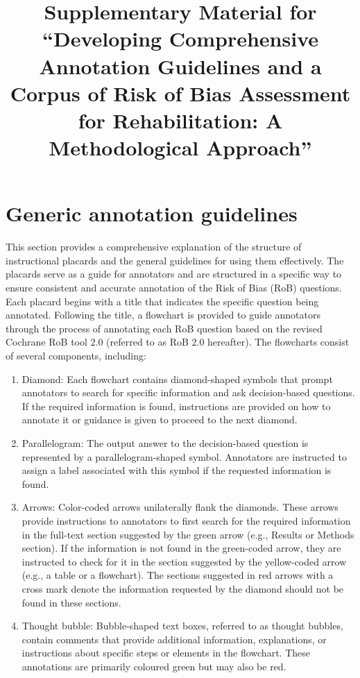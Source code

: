 \documentclass[sn-mathphys,Numbered]{sn-jnl}%
\begin{document}
\title[Article Title]{Supplementary Material for ``Developing Comprehensive Annotation Guidelines and a Corpus of Risk of Bias Assessment for Rehabilitation: A Methodological Approach''}



\maketitle


\section*{Generic annotation guidelines}
\label{sec:generic}
%
This section provides a comprehensive explanation of the structure of instructional placards and the general guidelines for using them effectively.
The placards serve as a guide for annotators and are structured in a specific way to ensure consistent and accurate annotation of the Risk of Bias (RoB) questions.
Each placard begins with a title that indicates the specific question being annotated.
Following the title, a flowchart is provided to guide annotators through the process of annotating each RoB question based on the revised Cochrane RoB tool 2.0 (referred to as RoB 2.0 hereafter).
The flowcharts consist of several components, including:
%
%
%
\begin{enumerate}
    \item Diamond: Each flowchart contains diamond-shaped symbols that prompt annotators to search for specific information and ask decision-based questions. If the required information is found, instructions are provided on how to annotate it or guidance is given to proceed to the next diamond.
    \item Parallelogram: The output answer to the decision-based question is represented by a parallelogram-shaped symbol. Annotators are instructed to assign a label associated with this symbol if the requested information is found.
    \item Arrows: Color-coded arrows unilaterally flank the diamonds. These arrows provide instructions to annotators to first search for the required information in the full-text section suggested by the green arrow (e.g., Results or Methods section). If the information is not found in the green-coded arrow, they are instructed to check for it in the section suggested by the yellow-coded arrow (e.g., a table or a flowchart). The sections suggested in red arrows with a cross mark denote the information requested by the diamond should not be found in these sections.
    \item Thought bubble: Bubble-shaped text boxes, referred to as thought bubbles, contain comments that provide additional information, explanations, or instructions about specific steps or elements in the flowchart. These annotations are primarily coloured green but may also be red.
\end{enumerate}
\end{document}
